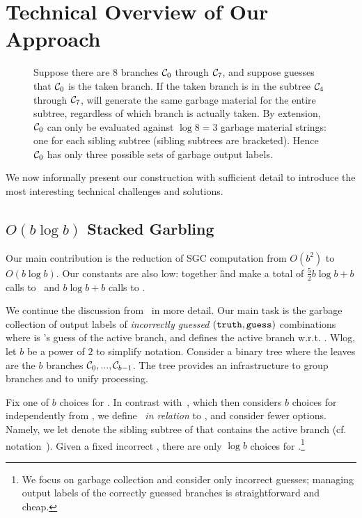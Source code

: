 
\section{Technical Overview of Our Approach}
\label{sec:techOverview}

\begin{figure*}[t]
  \centering
  
  \caption{%
    Suppose there are $8$ branches $\mathcal C_0$ through $\mathcal C_7$, and
    suppose \E guesses that $\mathcal C_0$ is the taken branch.
    If the taken branch is in the subtree $\mathcal C_4$ through $\mathcal C_7$,
    \E will generate the same garbage material for the entire subtree,
    regardless of which branch is actually taken.
    By extension, $\mathcal C_0$ can only be evaluated against $\log 8 = 3$ garbage
    material strings: one for each sibling subtree (sibling subtrees
    are bracketed). Hence $\mathcal C_0$ has only three possible sets of
    garbage output labels.
  }\label{fig:seed-tree}
\end{figure*}

We now informally present our construction with sufficient detail to introduce
the most interesting technical challenges and solutions.

\subsection{$O(b\log b)$ Stacked Garbling}
\label{sec:techOverviewSG}

Our main contribution is the reduction of SGC computation
from $O(b^2)$ to $O(b \log b)$.  Our constants are also
low: together \G and \E make a total of $\frac{5}{2} b \log b + b$ calls to \Gb\
and $b\log b + b$ calls  to \Ev.

We continue the discussion from~ in more detail.
Our main task is the garbage collection of output labels of {\em
incorrectly guessed} $(\mathtt{truth}, \mathtt{guess})$ combinations 
where
\guess is \E's guess of the active branch, and \truth defines the active branch w.r.t. \guess.
Wlog, let $b$ be a power of $2$ to simplify notation.
Consider a binary tree where the leaves are the $b$ branches
$\mathcal C_0,...,\mathcal C_{b-1}$.  The tree provides an infrastructure to group branches and to unify processing.


Fix one of $b$ choices for \guess.  In contrast with~\HK, which then considers $b$ choices for \truth independently from \guess, we define \truth\ {\em in relation} to \guess, and consider fewer \truth options.  Namely,
we  let \truth  denote the sibling subtree of \guess that contains the
active branch (cf. notation~\Cref{sec:intuition}). 
Given a fixed incorrect \guess, there are only $\log b$ choices for
\truth.\footnote{We focus on garbage collection and
consider only incorrect guesses;  managing output labels of the correctly guessed branches is straightforward and cheap.}

